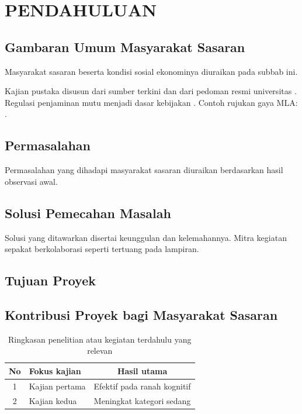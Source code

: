 \chapter{PENDAHULUAN}
\section{Gambaran Umum Masyarakat Sasaran}
Masyarakat sasaran beserta kondisi sosial ekonominya diuraikan pada subbab ini.

Kajian pustaka disusun dari sumber terkini \citep{creswell2018research, patten2017understanding}
dan dari pedoman resmi universitas \citep{unnes2024panduanakademik}. Regulasi penjaminan mutu
menjadi dasar kebijakan \citep{permendikbudristek2023}.
 Contoh rujukan gaya MLA: .

\section{Permasalahan}
Permasalahan yang dihadapi masyarakat sasaran diuraikan berdasarkan hasil observasi awal.

\section{Solusi Pemecahan Masalah}
Solusi yang ditawarkan disertai keunggulan dan kelemahannya. Mitra kegiatan sepakat
berkolaborasi seperti tertuang pada lampiran.

\section{Tujuan Proyek}
\section{Kontribusi Proyek bagi Masyarakat Sasaran}

\begin{table}[htbp]
  \centering
  \caption{Ringkasan penelitian atau kegiatan terdahulu yang relevan}
  \label{tab:terdahulu}
  \begin{tabular}{clc}
    \toprule
    No & Fokus kajian & Hasil utama \\
    \midrule
    1 & Kajian pertama \citep{martin2014write} & Efektif pada ranah kognitif \\
    2 & Kajian kedua \citep{geraldi2017project} & Meningkat kategori sedang \\
    \bottomrule
  \end{tabular}
\end{table}
